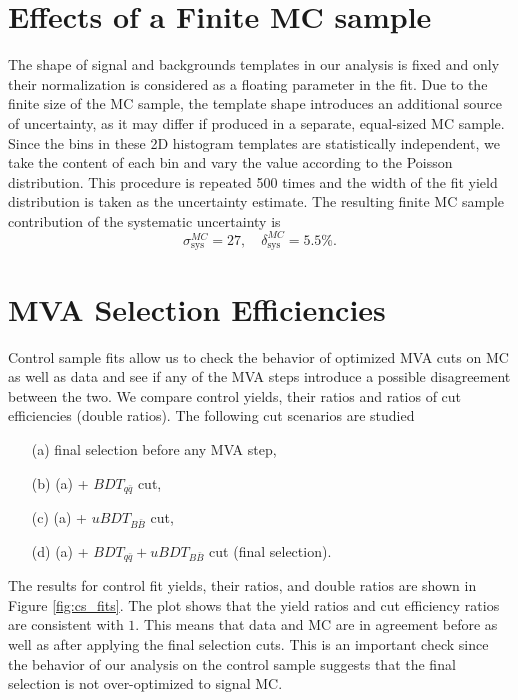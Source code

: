 \section{Effects of a Finite MC sample}
The shape of signal and backgrounds templates in our analysis is fixed and only their normalization is considered as a floating parameter in the fit. Due to the finite size of the MC sample, the template shape introduces an additional source of uncertainty, as it may differ if produced in a separate, equal-sized MC sample. Since the bins in these 2D histogram templates are statistically independent, we take the content of each bin and vary the value according to the Poisson distribution. This procedure is repeated 500 times and the width of the fit yield distribution is taken as the uncertainty estimate. The resulting finite MC sample contribution of the systematic uncertainty is
\begin{equation}
\sigma_{\mathrm{sys}}^{MC} = 27,\quad \delta_{\mathrm{sys}}^{MC} = 5.5\%.
\end{equation}


\section{MVA Selection Efficiencies}
Control sample fits allow us to check the behavior of optimized MVA cuts on MC as well as data and see if any of the MVA steps introduce a possible disagreement between the two. We compare control yields, their ratios and ratios of cut efficiencies (double ratios). The following cut scenarios are studied
\begin{itemize}
	\item[(a)] final selection before any MVA step,
	\item[(b)] (a) + $BDT_{q\bar q}$ cut,
	\item[(c)] (a) + $uBDT_{B\bar B}$ cut,
	\item[(d)] (a) + $BDT_{q\bar q} + uBDT_{B\bar B}$ cut (final selection).
\end{itemize}

The results for control fit yields, their ratios, and double ratios are shown in Figure \ref{fig:cs_fits}. The plot shows that the yield ratios and cut efficiency ratios are consistent with $1$. This means that data and MC are in agreement before as well as after applying the final selection cuts. This is an important check since the behavior of our analysis on the control sample suggests that the final selection is not over-optimized to signal MC.

